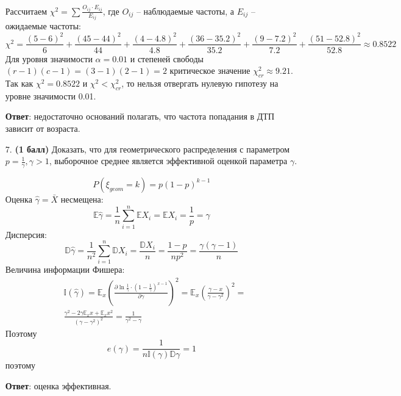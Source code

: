 \documentclass{assignment}
\begin{document}
\begin{enumerate}
    Рассчитаем $\chi^2 = \sum \frac{O_{ij}\cdot E_{ij}}{E_{ij}}$, где $O_{ij}$ -- наблюдаемые частоты, а $E_{ij}$ -- ожидаемые частоты:
    \begin{equation*}
        \chi^2 = \frac{(5-6)^2}{6} + \frac{(45-44)^2}{44} + \frac{(4-4.8)^2}{4.8} + \frac{(36-35.2)^2}{35.2} + \frac{(9-7.2)^2}{7.2} + \frac{(51-52.8)^2}{52.8} \approx 0.8522
    \end{equation*}
    Для уровня значимости $\alpha = 0.01$ и степеней свободы $(r-1)(c-1) = (3-1)(2-1) = 2$ критическое значение $\chi^2_{cr} \approx 9.21$. Так как $\chi^2=0.8522$ и $\chi^2 < \chi^2_{cr}$, то нельзя отвергать нулевую гипотезу на уровне значимости 0.01.

    \textbf{Ответ}: недостаточно оснований полагать, что частота попадания в ДТП зависит от возраста.
    \finish

    \item[7.] \textbf{(1 балл)} Доказать, что для геометрического распределения с параметром $\displaystyle p = \frac{1}{\gamma}, \gamma > 1$, выборочное среднее является эффективной оценкой параметра $\gamma$.

    $$P(\xi_{geom} = k) = p(1 - p)^{k - 1}$$
    \newline
    \start
    Оценка $\hat{\gamma} = \bar{X}$ несмещена:
    \begin{equation}
        \mathbb{E}\hat{\gamma} = \frac{1}{n}\sum_{i=1}^{n}\mathbb{E}X_i = \mathbb{E}X_i = \frac{1}{p} = \gamma
    \end{equation}
    Дисперсия:
    \begin{equation}
        \mathbb{D}\hat{\gamma} = \frac{1}{n^2}\sum_{i=1}^{n}\mathbb{D}X_i = \frac{\mathbb{D}X_i}{n} = \frac{1-p}{np^2} = \frac{\gamma(\gamma-1)}{n}
    \end{equation}
    Величина информации Фишера:
    \begin{align*}
        &\mathbb{I}(\hat{\gamma}) = \mathbb{E}_x(\frac{\partial \ln \frac{1}{\gamma}\cdot(1-\frac{1}{\gamma})^{x-1}}{\partial\gamma})^2 = \mathbb{E}_x(\frac{\gamma-x}{\gamma-\gamma^2})^2 = \\
        &\frac{\gamma^2-2\gamma\mathbb{E}_xx+\mathbb{E}_xx^2}{(\gamma-\gamma^2)^2} = \frac{1}{\gamma^2-\gamma}
    \end{align*}
    Поэтому
    \begin{equation}
        e(\gamma) = \frac{1}{n\mathbb{I}(\gamma)\mathbb{D}\gamma} = 1
    \end{equation}
    поэтому

    \textbf{Ответ}: оценка эффективная.
    \finish
    

\end{enumerate}
\end{document}
